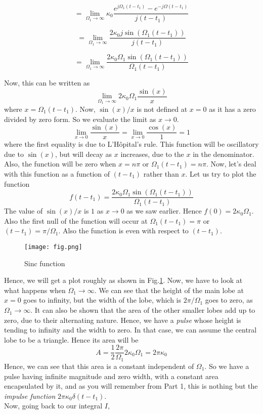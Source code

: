 \[
= \lim_{\Omega_1 \to \infty} \kappa_0 \frac{e^{j\Omega_1 (t-t_1)}-e^{-j\Omega (t-t_1)}}{j(t-t_1)}
\]

\[
= \lim_{\Omega_1 \to \infty}\frac{2\kappa_0 j\sin(\Omega_1 (t-t_1))}{j(t-t_1)}
\]

\[
= \lim_{\Omega_1 \to \infty}\frac{2\kappa_0\Omega_1\sin(\Omega_1 (t-t_1))}{\Omega_1(t-t_1)}
\]

Now, this can be written as 
\[
\lim_{\Omega_1 \to \infty} 2\kappa_0\Omega_1 \frac{\sin(x)}{x}
\]
where $x=\Omega_1(t-t_1)$. Now, $\sin(x)/x$ is not defined at $x=0$ as it has a zero divided by zero form. So we evaluate the limit as $x\to 0$.
\[
\lim_{x \to 0}\frac{\sin(x)}{x} = \lim_{x \to 0}\frac{\cos(x)}{1} = 1
\]
where the first equality is due to L'H\^opital's rule. This function will be oscillatory due to $\sin(x)$, but will decay as $x$ increases, due to the $x$ in the denominator. Also, the function will be zero when $x=n\pi$ or $\Omega_1(t-t_1)=n\pi$. Now, let's deal with this function as a function of $(t-t_1)$ rather than $x$. Let us try to plot the function
\[
f(t-t_1) = \frac{2\kappa_0\Omega_1\sin(\Omega_1 (t-t_1))}{\Omega_1(t-t_1)}
\]
The value of $\sin(x)/x$ is $1$ as $x \to 0$ as we saw earlier. Hence $f(0)=2\kappa_0\Omega_1$. Also the first null of the function will occur at $\Omega_1(t-t_1)=\pi$ or $(t-t_1)=\pi/\Omega_1$. Also the function is even with respect to $(t-t_1)$.
\begin{figure}[ht]
\texttt{[image: fig.png]}
\label{fig:sinc}
\caption{Sinc function}
\end{figure}
Hence, we will get a plot roughly as shown in Fig.\ref{fig:sinc}.
Now, we have to look at what happens when $\Omega_1 \to \infty$. We can see that the height of the main lobe at $x=0$ goes to infinity, but the width of the lobe, which is $2\pi/\Omega_1$ goes to zero, as $\Omega_1 \to \infty$. It can also be shown that the area of the other smaller lobes add up to zero, due to their alternating nature. Hence, we have a \emph{pulse} whose height is tending to infinity and the width to zero. In that case, we can assume the central lobe to be a triangle. Hence its area will be
\[
A = \frac{1}{2}\frac{2\pi}{\Omega_1}2\kappa_0\Omega_1 = 2\pi\kappa_0
\]
Hence, we can see that this area is a constant independent of $\Omega_1$. So we have a pulse having infinite magnitude and zero width, with a constant area encapsulated by it, and as you will remember from Part 1, this is nothing but the \emph{impulse function} $2\pi\kappa_0\delta(t-t_1)$.\\
Now, going back to our integral $I$,
